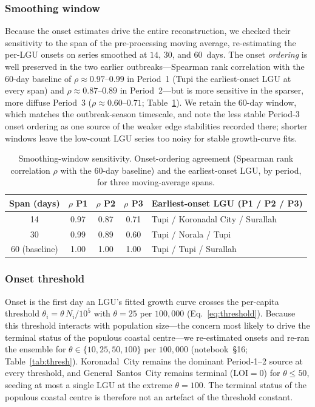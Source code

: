 \documentclass[a4paper,11pt]{article}
\begin{document}
\subsubsection*{Smoothing window}
Because the onset estimates drive the entire reconstruction, we checked their
sensitivity to the span of the pre-processing moving average, re-estimating the
per-LGU onsets on series smoothed at $14$, $30$, and $60$~days. The onset
\emph{ordering} is well preserved in the two earlier outbreaks---Spearman rank
correlation with the $60$-day baseline of $\rho\approx0.97$--$0.99$ in Period~1 (Tupi
the earliest-onset LGU at every span) and $\rho\approx0.87$--$0.89$ in Period~2---but
is more sensitive in the sparser, more diffuse Period~3 ($\rho\approx0.60$--$0.71$;
Table~\ref{tab:smooth}). We retain the $60$-day window, which matches the
outbreak-season timescale, and note the less stable Period-3 onset ordering as one
source of the weaker edge stabilities recorded there; shorter windows leave the
low-count LGU series too noisy for stable growth-curve fits.

\begin{table}[htbp]
\centering
\caption{Smoothing-window sensitivity. Onset-ordering agreement (Spearman rank
correlation $\rho$ with the $60$-day baseline) and the earliest-onset LGU, by period,
for three moving-average spans.}
\label{tab:smooth}
\small
\begin{tabular}{ccccl}
\toprule
\textbf{Span (days)} & \textbf{$\rho$ P1} & \textbf{$\rho$ P2} & \textbf{$\rho$ P3} &
\textbf{Earliest-onset LGU (P1 / P2 / P3)} \\
\midrule
14           & 0.97 & 0.87 & 0.71 & Tupi / Koronadal City / Surallah \\
30           & 0.99 & 0.89 & 0.60 & Tupi / Norala / Tupi \\
60 (baseline) & 1.00 & 1.00 & 1.00 & Tupi / Tupi / Surallah \\
\bottomrule
\end{tabular}
\end{table}

\subsubsection*{Onset threshold}
Onset is the first day an LGU's fitted growth curve crosses the per-capita threshold
$\theta_i = \theta\, N_i/10^5$ with $\theta=25$ per $100{,}000$ (Eq.~\ref{eq:threshold}).
Because this threshold interacts with population size---the concern most likely to
drive the terminal status of the populous coastal centre---we re-estimated onsets and
re-ran the ensemble for $\theta\in\{10,25,50,100\}$ per $100{,}000$
(notebook~\S16; Table~\ref{tab:thresh}). Koronadal~City remains the dominant
Period-1--2 source at every threshold, and General~Santos~City remains terminal
($\mathrm{LOI}=0$) for $\theta\le 50$, seeding at most a single LGU at the extreme
$\theta=100$. The terminal status of the populous coastal centre is therefore not an
artefact of the threshold constant.
\end{document}
